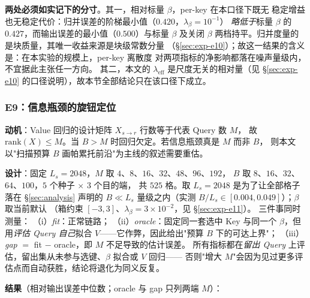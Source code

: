 \textbf{两处必须如实记下的分寸}。其一，相对标量 $\beta$，per-key 在本口径下既无
稳定增益也无稳定代价：归并误差的阶梯最小值（$0.420$，$\lambda_\beta=10^{-1}$）
\emph{略低于}标量 $\beta$ 的 $0.427$，而输出误差的最小值（$0.500$）与标量 $\beta$
及关闭 $\beta$ 两档持平。归并度量的是块质量，其唯一收益来源是块级常数分量
（\S\ref{sec:exp-e10}）；故这一结果的含义是：在本实验的规模上，per-key 离散度
对两项指标的净影响都落在噪声量级内，不宜据此主张任一方向。
其二，本文的 $\lambda_{\text{eff}}$ 是尺度无关的相对量（见 \S\ref{sec:exp-e10}
的口径说明），故本节全部结论只在该口径下成立。

\subsubsection{E9：信息瓶颈的旋钮定位}

\textbf{动机}：Value 回归的设计矩阵 $X_{s\to r}$ 行数等于代表 Query 数 $M$，
故 $\mathrm{rank}(X)\le M$。当 $B>M$ 时回归欠定。若信息瓶颈真是 $M$ 而非 $B$，
则本文以"扫描预算 $B$ 画帕累托前沿"为主线的叙述需要重估。

\textbf{设计}：固定 $L_s=2048$，$M$ 取 $4$、$8$、$16$、$32$、$48$、$96$、$192$，
$B$ 取 $8$、$16$、$32$、$64$、$100$，$5$ 个种子 $\times$ $3$ 个目的端，
共 $525$ 格。取 $L_s=2048$ 是为了让全部格子落在 \S\ref{sec:analysis} 声明的
$B\ll L_s$ 量级之内（实测 $B/L_s\in[0.004,0.049]$）；$\beta$ 取当前默认
（箱约束 $[-3,3]$、$\lambda_\beta=3\times10^{-2}$，见 \S\ref{sec:exp-e11}）。
三件事同时测量：
（i）\emph{fit}：正常链路；
（ii）\emph{oracle}：固定同一套选中 Key 与同一个 $\beta$，但用\emph{评估 Query
自己}拟合 $V$——它作弊，因此给出"预算 $B$ 下的可达上界"；
（iii）\emph{gap} $=$ fit $-$ oracle，即 $M$ 不足导致的估计误差。
所有指标都在\emph{留出 Query} 上评估，留出集从未参与选键、$\beta$ 拟合或 $V$ 回归——
否则"增大 $M$"会因为见过更多评估点而自动获胜，结论将退化为同义反复。

\textbf{结果}（相对输出误差中位数；oracle 与 gap 只列两端 $M$）：

